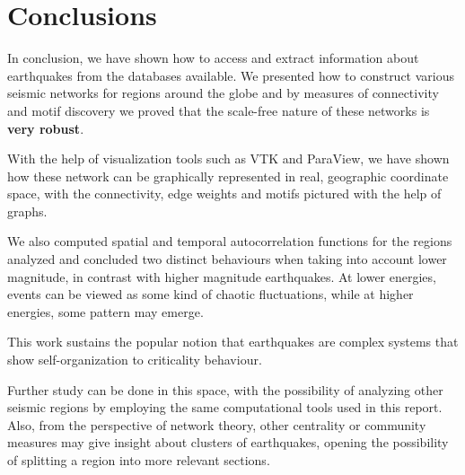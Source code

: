 \chapter*{Conclusions}
In conclusion, we have shown how to access and extract information about earthquakes from the databases available. We presented how to construct various seismic networks for regions around the globe and by measures of connectivity and motif discovery we proved that the scale-free nature of these networks is {\bf very robust}.\par 
With the help of visualization tools such as VTK and ParaView, we have shown how these network can be graphically represented in real, geographic coordinate space, with the connectivity, edge weights and motifs pictured with the help of graphs.\par 
We also computed spatial and temporal autocorrelation functions for the regions analyzed and concluded two distinct behaviours when taking into account lower magnitude, in contrast with higher magnitude earthquakes. At lower energies, events can be viewed as some kind of chaotic fluctuations, while at higher energies, some pattern may emerge. \par 
This work sustains the popular notion that earthquakes are complex systems that show self-organization to criticality behaviour. \par 
Further study can be done in this space, with the possibility of analyzing other seismic regions by employing the same computational tools used in this report. Also, from the perspective of network theory, other centrality or community measures may give insight about clusters of earthquakes, opening the possibility of splitting a region into more relevant sections. 